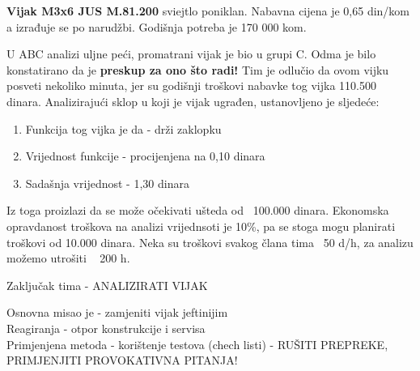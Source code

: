 \documentclass[a4paper,12pt]{article}
\numberwithin{figure}{section}
\begin{document}
\textbf{Vijak M3x6 JUS M.81.200} sviejtlo poniklan. Nabavna cijena je 0,65 din/kom a izrađuje se po narudžbi. Godišnja potreba je 170 000 kom.

U ABC analizi uljne peći, promatrani vijak je bio u grupi C. Odma je bilo konstatirano da je \textbf{preskup za ono što radi!} Tim je odlučio da ovom vijku posveti nekoliko minuta, jer su godišnji troškovi nabavke tog vijka 110.500 dinara. Analizirajući sklop u koji je vijak ugrađen, ustanovljeno je sljedeće:
\begin{enumerate}
\item Funkcija tog vijka je da - drži zaklopku
\item Vrijednost funkcije - procijenjena na 0,10 dinara
\item Sadašnja vrijednost - 1,30 dinara
\end{enumerate} 
Iz toga proizlazi da se može očekivati ušteda od ~100.000 dinara. Ekonomska opravdanost troškova na analizi vrijednsoti je 10\%, pa se stoga mogu planirati troškovi od 10.000 dinara. Neka su troškovi svakog člana tima ~50 d/h, za analizu možemo utrošiti ~ 200 h.
\begin{center}
Zaključak tima - ANALIZIRATI VIJAK
\end{center}
Osnovna misao je - zamjeniti vijak jeftinijim\\
Reagiranja - otpor konstrukcije i servisa\\
Primjenjena metoda - korištenje testova (chech listi) - RUŠITI PREPREKE, PRIMJENJITI PROVOKATIVNA PITANJA!
\end{document}
